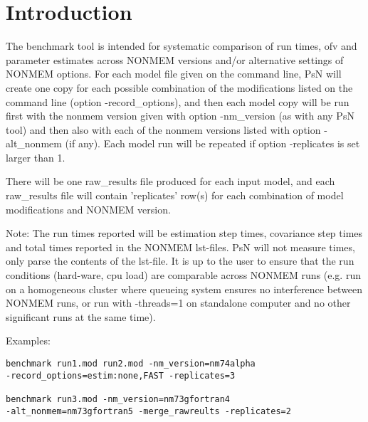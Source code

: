 




\maketitle
\newcommand{\guidetoolname}{benchmark}


\section{Introduction}
The benchmark tool is intended for systematic comparison of run times, ofv and parameter estimates
across NONMEM versions and/or alternative settings of NONMEM options.
For each model file given on the command line, PsN will create one copy for each possible combination
of the modifications listed on the command line (option -record\_options), and
then each model copy will be run first with the nonmem version given
with option -nm\_version (as with any PsN tool) and then also with
each of the nonmem versions listed with option -alt\_nonmem (if any).
Each model run will be repeated if option -replicates is set larger than 1.

There will be one raw\_results file produced for each input model, and each raw\_results file will contain 
'replicates' row(s)
for each combination of model modifications and NONMEM version. 

Note: The run times reported will be estimation step times, covariance step times and total times reported in the NONMEM lst-files.
PsN will not measure times, only parse the contents of the lst-file. It is up to the user to ensure that the run conditions 
(hard-ware, cpu load) are comparable across NONMEM runs (e.g. run on a homogeneous cluster where queueing system ensures 
no interference between NONMEM runs, or run with -threads=1 on standalone computer and no other significant runs at the same time).

Examples:
\begin{verbatim}
benchmark run1.mod run2.mod -nm_version=nm74alpha 
-record_options=estim:none,FAST -replicates=3

benchmark run3.mod -nm_version=nm73gfortran4 
-alt_nonmem=nm73gfortran5 -merge_rawreults -replicates=2
\end{verbatim}

